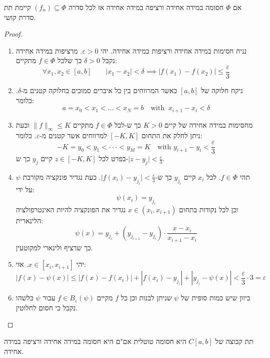 \documentclass{tstextbook}
\begin{document}
\begin{lemma}
אם \(\Phi\) חסומה במידה אחידה ורציפה במידה אחידה אז לכל סדרה \((f_{n})\subseteq \Phi\) קיימת תת סדרת קושי.

\end{lemma}
\begin{proof}
  \begin{enumerate}
    \item נניח חסימות במידה אחידה ורציפות במידה אחידה. יהי \(\varepsilon> 0\). מרציפות במידה אחידה נקבל \(\delta>0\) כך שלכל \(f \in \Phi\) מתקיים: 
$$\forall x_{1},x_{2}\in[a,b]\qquad \lvert x_{1}-x_{2} \rvert <\delta\implies \lvert f(x_{1})-f(x_{2}) \rvert \leq  \frac{\varepsilon}{3} $$


    \item ניקח חלוקה של \([a,b]\) כאשר המרווחים בין כל איברים סמוכים בחלוקה קטנים מ-\(\delta\). כלומר: 
$$a = x_0 < x_1 < \dots < x_N = b \quad \text{with}\;\;x_{i+1} - x_i < \delta$$


    \item מחסימות במידה אחידה של קיים \(K>0\) כך ש-לכל \(f \in \Phi\) מתקיים \(\lVert f \rVert_{\infty}\leq K\) וכעת ניתן לחלק את התחום \([-K,K]\) למרווחים אשר קטנים מ-\(\varepsilon\). כלומר: 
$$-K=y_{0}<y_{1}<\cdot\cdot\cdot<y_{M}=K\quad \text{with }y_{i+1}-y_{i}<\frac{\varepsilon}{3}$$
בפרט לכל \(z \in [-K,K]\) קיים \(y_{j}\) כך ש-\(\lvert z-y_{j} \rvert<\frac{\varepsilon}{3}\).


    \item תהי \(f \in \Phi\). לכל \(x_{i}\) קיים \(y_{j_{i}}\) כך ש-\(\lvert f(x_{i})-y_{j_{i}} \rvert<\frac{\varepsilon}{3}\). כעת נגדיר פונקציה מקורבת \(\psi\) על ידי: 
$$\psi(x_{i})=y_{j_{i}}$$
וכן לכל נקודות בתחום \(x \in (x_{i},x_{i+1})\) נגדיר את הפונקציה להיות האינטרפולציה הלינארית:
$$\psi(x)=y_{j_{i}}+(y_{j_{i+1}}-y_{j_{i}})\cdot{\frac{x-x_{i}}{x_{i+1}-x_{i}}}$$
כך שרציף ולינארי למקוטעין.


    \item יהי \(x \in [x_{i},x_{i+1}]\). אזי: 
$$|f(x)-\psi(x)|\leq|f(x)-f(x_{i})|+|f(x_{i})-y_{j_{i}}|+|y_{j_{i}}-\psi(x)|<\frac{\varepsilon}{3}\cdot 3 = \varepsilon$$


    \item כיוון שיש כמות סופית של \(\psi\) שניתן לבנות וכן כל \(f\) מקיים \(f \in B_{\varepsilon}(\psi)\) עבור \(\psi\) כלשהו נקבל כי חסום לחלוטין. 


  \end{enumerate}
\end{proof}
\begin{corollary}
תת קבוצה של \(C[a,b]\) היא חסומה טוטלית אם"ם היא חסומה במידה אחידה ורציפה במידה אחידה.

\end{corollary}
\end{document}
